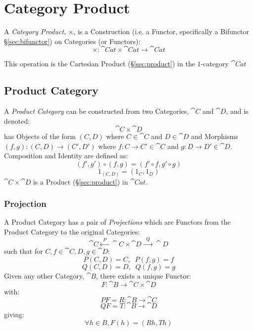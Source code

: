 \section{Category Product}\label{sec:category_product}

A \emph{Category Product}, $\times$, is a Construction (i.e. a Functor,
specifically a Bifunctor \S\ref{sec:bifunctor}) on Categories (or
Functors):
\[
  \times : \cat{Cat} \times \cat{Cat} \rightarrow \cat{Cat}
\]

This operation is the Cartesian Product (\S\ref{sec:product}) in the
$1$-category $\cat{Cat}$



\subsection{Product Category}\label{sec:product_category}

A \emph{Product Category} can be constructed from two Categories,
$\cat{C}$ and $\cat{D}$, and is denoted:
\[
  \cat{C} \times \cat{D}
\]
has Objects of the form $(C,D)$ where $C \in \cat{C}$ and $D \in
\cat{D}$ and Morphisms $(f,g) : (C,D) \rightarrow (C',D')$ where $f
: C \rightarrow C' \in \cat{C}$ and $g : D \rightarrow D' \in
\cat{D}$. Composition and Identity are defined as:
\[
  (f',g') \circ (f,g) = (f' \circ f,g' \circ g)
\]\[
  1_{(C,D)} = (1_C, 1_D)
\]
$\cat{C} \times \cat{D}$ is a Product (\S\ref{sec:product}) in
$\cat{Cat}$.



\subsubsection{Projection}\label{sec:projection_functor}

A Product Category has a pair of \emph{Projections} which are Functors
from the Product Category to the original Categories:
\[
  \cat{C} \xleftarrow{\;\; P\;\;} \cat{C}\times\cat{D}
  \xrightarrow{\;\; Q\;\;} \cat{D}
\]
such that for $C,f \in \cat{C}, D,g \in \cat{D}$:
\[
  P(C,D) = C, \;\; P(f,g) = f
\]\[
  Q(C,D) = D, \;\; Q(f,g) = g
\]
Given any other Category, $\cat{B}$, there exists a unique Functor:
\[
  F : \cat{B} \rightarrow \cat{C} \times \cat{D}
\]
with:
\[
  PF = R : \cat{B} \rightarrow \cat{C}
\]\[
  QF = T : \cat{B} \rightarrow \cat{D}
\]
giving:
\[
  \forall h \in B, F(h) = (Rh,Th)
\]



